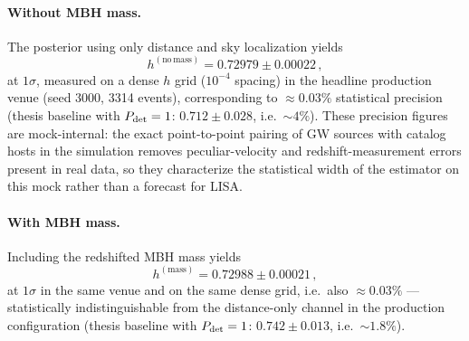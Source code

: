 \paragraph{Without MBH mass.}
The posterior using only distance and sky localization yields
\begin{equation}
  h^\mathrm{(no\,mass)} = 0.72979 \pm 0.00022 \,,
  \label{eq:h0_no_mass}
\end{equation}
at $1\sigma$, measured on a dense $h$ grid ($10^{-4}$ spacing) in the
headline production venue (seed 3000, 3314 events), corresponding to
$\approx 0.03\%$ statistical precision
(thesis baseline with $P_\mathrm{det} = 1$: $0.712 \pm 0.028$, i.e.\
$\sim 4\%$).
These precision figures are mock-internal: the exact point-to-point
pairing of GW sources with catalog hosts in the simulation removes
peculiar-velocity and redshift-measurement errors present in real
data, so they characterize the statistical width of the estimator on
this mock rather than a forecast for LISA.

\paragraph{With MBH mass.}
Including the redshifted MBH mass yields
\begin{equation}
  h^\mathrm{(mass)} = 0.72988 \pm 0.00021 \,,
  \label{eq:h0_with_mass}
\end{equation}
at $1\sigma$ in the same venue and on the same dense grid, i.e.\ also
$\approx 0.03\%$ --- statistically indistinguishable from the
distance-only channel in the production configuration
(thesis baseline with $P_\mathrm{det} = 1$: $0.742 \pm 0.013$, i.e.\
$\sim 1.8\%$).

